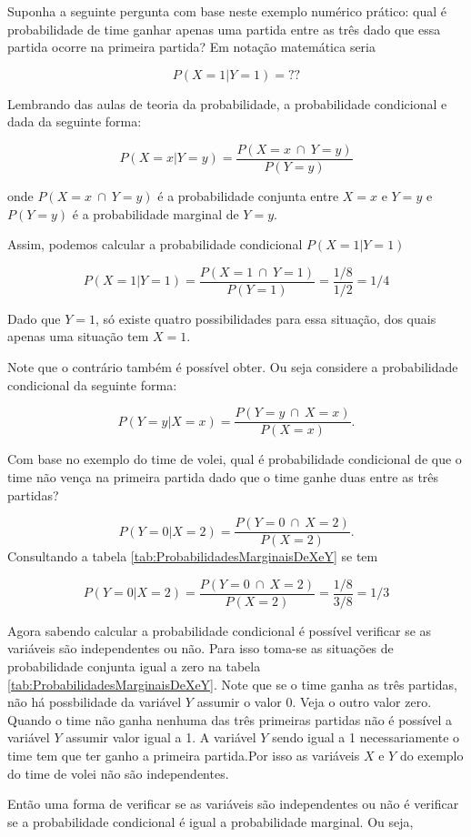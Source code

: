 \documentclass[
]{book}
\begin{document}
Suponha a seguinte pergunta com base neste exemplo numérico prático: qual é probabilidade de time ganhar apenas uma partida entre as três dado que essa partida ocorre na primeira partida? Em notação matemática seria

\[
  P(X=1|Y=1) = \text{??}
\]

Lembrando das aulas de teoria da probabilidade, a probabilidade condicional e dada da seguinte forma:

\[
  P(X=x|Y=y) = \dfrac{P (X=x~\cap~Y=y)}{P(Y=y)}
\]

onde \(P (X=x~\cap~Y=y)\) é a probabilidade conjunta entre \(X=x\) e \(Y=y\) e \(P(Y=y)\) é a probabilidade marginal de \(Y=y\).

Assim, podemos calcular a probabilidade condicional \(P(X=1|Y=1)\)

\[
  P(X=1|Y=1) = \dfrac{P (X=1~\cap~Y=1)}{P(Y=1)} = \dfrac{1/8}{1/2} = 1/4
\]

Dado que \(Y=1\), só existe quatro possibilidades para essa situação, dos quais apenas uma situação tem \(X=1\).

Note que o contrário também é possível obter. Ou seja considere a probabilidade condicional da seguinte forma:

\[
  P(Y=y|X=x) = \dfrac{P (Y=y~\cap~X=x)}{P(X=x)}.
\]

Com base no exemplo do time de volei, qual é probabilidade condicional de que o time não vença na primeira partida dado que o time ganhe duas entre as três partidas?

\[
  P(Y=0|X=2) = \dfrac{P (Y=0~\cap~X=2)}{P(X=2)}.
\]
Consultando a tabela \ref{tab:ProbabilidadesMarginaisDeXeY} se tem

\[
  P(Y=0|X=2) = \dfrac{P (Y=0~\cap~X=2)}{P(X=2)} = \dfrac{1/8}{3/8} = 1/3
\]

Agora sabendo calcular a probabilidade condicional é possível verificar se as variáveis são independentes ou não. Para isso toma-se as situações de probabilidade conjunta igual a zero na tabela \ref{tab:ProbabilidadesMarginaisDeXeY}. Note que se o time ganha as três partidas, não há possbilidade da variável \(Y\) assumir o valor 0. Veja o outro valor zero. Quando o time não ganha nenhuma das três primeiras partidas não é possível a variável \(Y\) assumir valor igual a 1. A variável \(Y\) sendo igual a 1 necessariamente o time tem que ter ganho a primeira partida.Por isso as variáveis \(X\) e \(Y\) do exemplo do time de volei não são independentes.

Então uma forma de verificar se as variáveis são independentes ou não é verificar se a probabilidade condicional é igual a probabilidade marginal. Ou seja,
\end{document}

